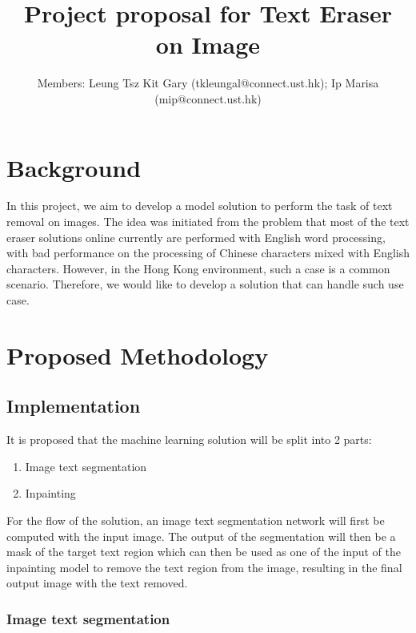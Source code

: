 \documentclass[10pt,twocolumn,letterpaper]{article}
\begin{document}
\title{Project proposal for Text Eraser on Image}

\author{
Members: Leung Tsz Kit Gary (tkleungal@connect.ust.hk);  %
Ip Marisa (mip@connect.ust.hk)
}
\maketitle

\section{Background}

In this project, we aim to develop a model solution to perform the task of text removal on images. 
The idea was initiated from the problem that most of the text eraser solutions online currently are performed with English word processing, 
with bad performance on the processing of Chinese characters mixed with English characters. 
However, in the Hong Kong environment, such a case is a common scenario. Therefore, we would like to develop a solution that can handle such use case.

\section{Proposed Methodology}

\subsection{Implementation}

It is proposed that the machine learning solution will be split into 2 parts:
\begin{enumerate}
    \item Image text segmentation
    \item Inpainting
\end{enumerate}

For the flow of the solution, an image text segmentation network will first be computed with the input image.
The output of the segmentation will then be a mask of the target text region which can then be used as one of the input of the 
inpainting model to remove the text region from the image, resulting in the final output image with the text removed.

\subsubsection{Image text segmentation}
\end{document}
